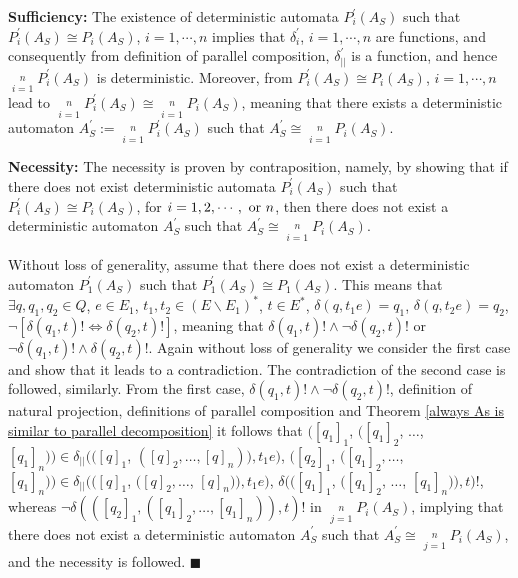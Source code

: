 \textbf{Sufficiency:} The existence of deterministic automata
$P_i^{\prime}(A_S)$ such that $P_i^{\prime}(A_S) \cong P_i(A_S)$, $i
= 1, \cdots, n$ implies that $\delta^{\prime}_i$, $i = 1, \cdots, n$
are functions, and consequently from definition of parallel
composition,
$\delta_{||}^{\prime}$ is a function, and hence $\mathop
{||}\limits_{i = 1}^n P_i^{\prime}(A_S)$ is deterministic. Moreover,
from $P_i^{\prime}(A_S) \cong
P_i(A_S)$, $i = 1,\cdots, n$ lead to $\mathop {||}\limits_{i = 1}^n
P_i^{\prime}(A_S)\cong \mathop {||}\limits_{i = 1}^n P_i(A_S)$,
meaning that there exists a deterministic automaton $A^{\prime}_S :=
\mathop {||}\limits_{i = 1}^n P_i^{\prime}(A_S)$ such that
$A^{\prime}_S \cong \mathop {||}\limits_{i = 1}^n P_i(A_S)$.

\textbf{Necessity:} The necessity is proven by contraposition,
namely, by showing that if there does not exist deterministic
automata $P_i^{\prime}(A_S)$ such that $P_i^{\prime}(A_S) \cong
P_i(A_S)$, for $i = 1, 2, \cdots, \hbox{ or } n$, then there does
not exist a deterministic automaton $A^{\prime}_S$ such that
$A^{\prime}_S \cong \mathop {||}\limits_{i = 1}^n P_i(A_S)$.

Without loss of generality, assume that there does not exist a
deterministic automaton $P_1^{\prime}(A_S)$ such that
$P_1^{\prime}(A_S) \cong P_1(A_S)$. This means that $\exists q, q_1,
q_2 \in Q$, $e\in E_1$, $t_1, t_2\in (E\backslash E_1)^*$, $t\in
E^*$, $\delta(q, t_1e) = q_1$, $\delta(q, t_2e) = q_2$,
$\neg[\delta(q_1, t)!\Leftrightarrow \delta(q_2, t)!]$, meaning that
$\delta(q_1, t)!\wedge \neg\delta(q_2, t)!$ or $\neg\delta(q_1,
t)!\wedge \delta(q_2, t)!$. Again without loss of generality we
consider the first case and show that it leads to a contradiction.
The contradiction of the second case is followed, similarly. From
the first case, $\delta(q_1, t)!\wedge \neg\delta(q_2, t)!$,
definition of natural projection, definitions of parallel
composition and Theorem \ref{always As is similar to parallel
decomposition}
 it follows that
 $([q_1]_1$, $([q_1]_2$, $\ldots$, $[q_1]_n))\in \delta_{||}(([q]_1$, $([q]_2, \ldots, [q]_n)), t_1e)$,
 $([q_2]_1$, $([q_1]_2, \ldots$, $[q_1]_n))\in \delta_{||}(([q]_1$, $([q]_2, \ldots$, $[q]_n)), t_1e)$,
 $\delta(([q_1]_1$, $([q_1]_2$, $\ldots$, $[q_1]_n)), t)!$, whereas  $\neg\delta(([q_2]_1, ([q_1]_2, \ldots, [q_1]_n)), t)!$
in $\mathop {||}\limits_{j = 1}^n P_i(A_S)$, implying that there
does not exist a deterministic automaton $A^{\prime}_S$ such that
$A^{\prime}_S \cong \mathop {||}\limits_{j = 1}^n P_i(A_S)$, and the
necessity is followed.
 $\blacksquare$

